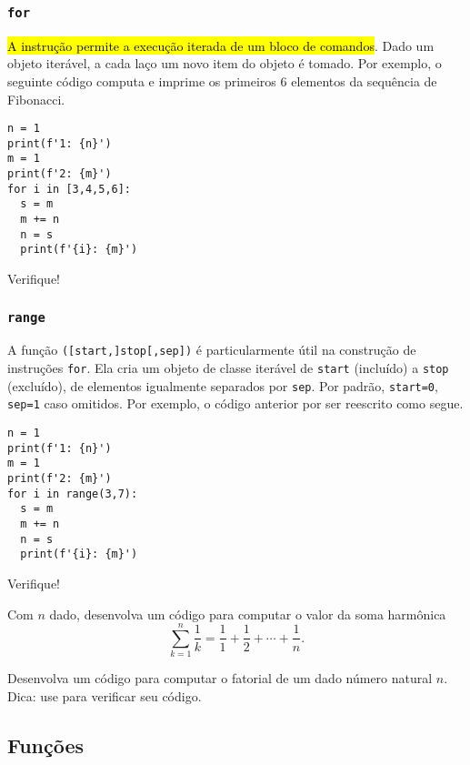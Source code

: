\documentclass[a4paper,10pt,twoside]{article}
\begin{document}
\subsubsection{\texttt{for}}

\hl{A instrução {\PYTHONfor} permite a execução iterada de um bloco de comandos}. Dado um objeto iterável, a cada laço um novo item do objeto é tomado. Por exemplo, o seguinte código computa e imprime os primeiros $6$ elementos da sequência de Fibonacci.

\begin{lstlisting}
n = 1
print(f'1: {n}')
m = 1
print(f'2: {m}')
for i in [3,4,5,6]:
  s = m
  m += n
  n = s
  print(f'{i}: {m}')
\end{lstlisting}

Verifique!

\subsubsection{\texttt{range}}

A função {\PYTHONrange}\texttt{([start,]stop[,sep])} é particularmente útil na construção de instruções \texttt{for}. Ela cria um objeto de classe iterável de \texttt{start} (incluído) a \texttt{stop} (excluído), de elementos igualmente separados por \texttt{sep}. Por padrão, \texttt{start=0}, \texttt{sep=1} caso omitidos. Por exemplo, o código anterior por ser reescrito como segue.

\begin{lstlisting}
n = 1
print(f'1: {n}')
m = 1
print(f'2: {m}')
for i in range(3,7):
  s = m
  m += n
  n = s
  print(f'{i}: {m}')
\end{lstlisting}

Verifique!

\begin{exr}
  Com $n$ dado, desenvolva um código para computar o valor da soma harmônica
  \begin{equation}
    \sum_{k=1}^n \frac{1}{k} = \frac{1}{1} + \frac{1}{2} + \cdots + \frac{1}{n}.
  \end{equation}
\end{exr}

\begin{exr}
  Desenvolva um código para computar o fatorial de um dado número natural $n$. Dica: use {\PYTHONmathDOTfactorial} para verificar seu código.
\end{exr}

\subsection{Funções}
\end{document}
